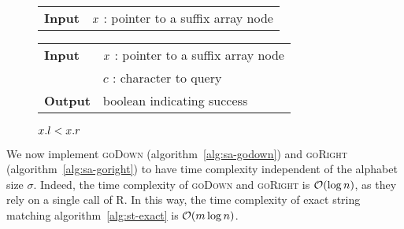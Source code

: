 \begin{figure*}
\begin{minipage}[t]{.5\textwidth}
\begin{algorithm}[H]
\begin{tabular}{ll}
\textbf{Input}  & $x$ : pointer to a suffix array node\\
\end{tabular}
\begin{algorithmic}[1]
\end{algorithmic}
\label{alg:sa-goroot}
\end{algorithm}
\end{minipage}
\hfill
\begin{minipage}[t]{.5\textwidth}
\begin{algorithm}[H]
\begin{tabular}{ll}
\textbf{Input}  & $x$ : pointer to a suffix array node\\
				& $c$ : character to query\\
\textbf{Output} & boolean indicating success\\
\end{tabular}
\begin{algorithmic}[1]
	\State \Return \False
\EndIf
{}
\State \Return $x.l < x.r$
\end{algorithmic}
\label{alg:sa-godownc}
\end{algorithm}
\end{minipage}
\end{figure*}

We now implement \textsc{goDown} (algorithm~\ref{alg:sa-godown}) and \textsc{goRight} (algorithm~\ref{alg:sa-goright}) to have time complexity independent of the alphabet size $\sigma$.
Indeed, the time complexity of \textsc{goDown} and \textsc{goRight} is $\mathcal{O}(\log{n})$, as they rely on a single call of \textsc{R}.
In this way, the time complexity of exact string matching algorithm~\ref{alg:st-exact} is $\mathcal{O}(m \log{n})$.

